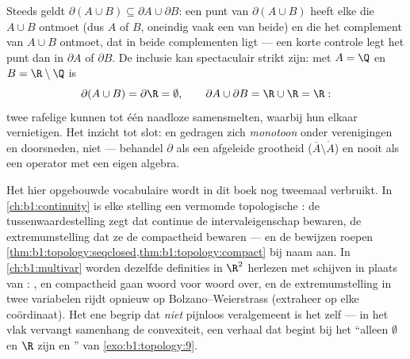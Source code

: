 \begin{example}\label{ex:b1:topology:boundaryunion}
Steeds geldt $\partial(A \cup B) \subseteq \partial A \cup \partial B$:
een punt van $\partial(A \cup B)$ heeft elke  die $A \cup B$
ontmoet (dus $A$ of $B$, oneindig vaak een van beide) en die het
complement van $A \cup B$ ontmoet, dat in beide complementen ligt --- een
korte controle legt het punt dan in $\partial A$ of $\partial B$. De
inclusie kan spectaculair strikt zijn: met $A = \Q$ en $B =
\R\setminus\Q$ is
\[
\partial(A \cup B) = \partial \R = \emptyset ,
\qquad
\partial A \cup \partial B = \R \cup \R = \R :
\]
twee rafelige  kunnen tot één naadloze samensmelten, waarbij
hun  elkaar vernietigen. Het inzicht tot slot:  en
 gedragen zich \emph{monotoon} onder verenigingen en
doorsneden,  niet --- behandel $\partial$ als een afgeleide
grootheid ($\overline A \setminus \mathring A$) en nooit als een operator
met een eigen algebra.
\end{example}

\begin{remark}
Het hier opgebouwde vocabulaire wordt in dit boek nog tweemaal verbruikt.
In \cref{ch:b1:continuity} is elke stelling een vermomde topologische
: de tussenwaardestelling zegt dat continue  de
intervaleigenschap bewaren, de extremumstelling dat ze de compactheid
bewaren --- en de bewijzen roepen
\cref{thm:b1:topology:seqclosed,thm:b1:topology:compact} bij naam aan. In
\cref{ch:b1:multivar} worden dezelfde definities in $\R^2$ herlezen met
schijven in plaats van : ,  en
compactheid gaan woord voor woord over, en de extremumstelling in twee
variabelen rijdt opnieuw op Bolzano--Weierstrass (extraheer op elke
coördinaat). Het ene begrip dat \emph{niet} pijnloos veralgemeent is het
 zelf --- in het vlak vervangt samenhang de convexiteit, een
verhaal dat begint bij het ``alleen $\emptyset$ en $\R$ zijn  en
'' van \cref{exo:b1:topology:9}.
\end{remark}

